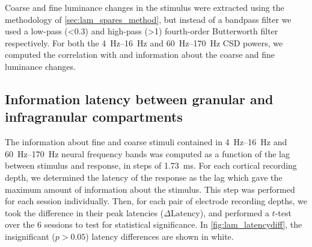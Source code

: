 Coarse and fine luminance changes in the stimulus were extracted using the methodology of \autoref{sec:lam_spares_method}, but instead of a bandpass filter we used a low-pass (\SI{<0.3}{\cpd}) and high-pass (\SI{>1}{\cpd}) fourth-order Butterworth filter respectively.
For both the \SIrange{4}{16}{Hz} and \SIrange{60}{170}{Hz} \ac{CSD} powers, we computed the correlation with and information about the coarse and fine luminance changes.


\subsection{Information latency between granular and infragranular compartments}
\label{sec:lam_latency_method}

The information about fine and coarse stimuli contained in \SIrange{4}{16}{Hz} and \SIrange{60}{170}{Hz} neural frequency bands was computed as a function of the lag between stimulus and response, in steps of \SI{1.73}{\milli\second}.
For each cortical recording depth, we determined the latency of the response as the lag which gave the maximum amount of information about the stimulus.
This step was performed for each session individually.
%
Then, for each pair of electrode recording depths, we took the difference in their peak latencies ($\Delta\text{Latency}$), and performed a $t$-test over the \num{6} sessions to test for statistical significance.
In \autoref{fig:lam_latencydiff}, the insignificant ($p>0.05$) latency differences are shown in white.
%


